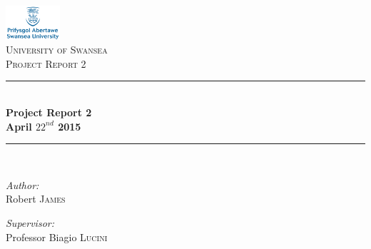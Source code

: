 \begin{titlepage}
\begin{center}
\newcommand{\HRule}{\rule{\linewidth}{0.5mm}}
\includegraphics[width=0.15\textwidth]{./SwanseaLogo}~\\[1cm]

\textsc{\LARGE University of Swansea}\\[1.5cm]

\textsc{\Large Project Report 2}\\[0.5cm]

\HRule \\[0.4cm]
{ \huge \bfseries Project Report 2\\ April $22^{nd}$ 2015 \\[0.4cm] }

\HRule \\[1.5cm]

\noindent
\begin{minipage}{0.4\textwidth}
\begin{flushleft} \large
\emph{Author:}\\
Robert \textsc{James}
\end{flushleft}
\end{minipage}%
\begin{minipage}{0.4\textwidth}
\begin{flushright} \large
\emph{Supervisor:} \\
Professor Biagio \textsc{Lucini}
\end{flushright}
\end{minipage}

\vfill


\end{center}

\clearpage

\end{titlepage}
